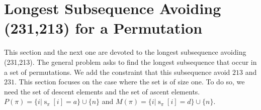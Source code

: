 \documentclass[a4paper]{llncs}
\newcommand{\ptext}{\pi}
\newcommand{\pmotif}{\sigma}
\DeclareMathOperator{\stripea}{s}
\newcommand{\stripe}[2]{\stripea_{{#1}}[{#2}]}
\newcommand{\dstep}{d}
\newcommand{\ustep}{a}
\newcommand{\x}{X}
\newcommand{\y}{Y}
\newcommand{\pbmotif}{\pmotif^+}
\DeclareMathOperator{\PMa}{PM}
\newcommand{\PM}[6]{\PMa_{{#1}}^{{#2},{#3},{#4}}({#5},{#6})}
\begin{document}
%	
%	
%	
%			
%	
%



\section{Longest Subsequence Avoiding \\(231,213) for a Permutation}
\label{section:LCS}

	This section and the next one are devoted to the longest subsequence avoiding (231,213).
	The general problem asks to find the longest subsequence that occur in a set of permutations. We add the constraint that this subsequence avoid $213$ and $231$.
	This section focuses on the case where the set is of size one.
	To do so, we need the set of descent elements and the set of ascent elements.
	$P(\pi) = \{i | \stripe{\pi}{i} = \ustep \} \cup \{n\}$ and
	$M(\pi) = \{i | \stripe{\pi}{i} = \dstep \} \cup \{n\}$.\\
\end{document}

